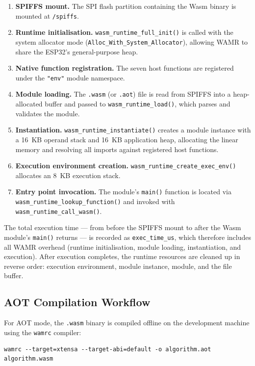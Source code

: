 \documentclass[12pt, a4paper]{report}
\begin{document}
\begin{enumerate}
    \item \textbf{SPIFFS mount.} The SPI flash partition containing the Wasm binary is mounted at \texttt{/spiffs}.
    \item \textbf{Runtime initialisation.} \texttt{wasm\_runtime\_full\_init()} is called with the system allocator mode (\texttt{Alloc\_With\_System\_Allocator}), allowing WAMR to share the ESP32's general-purpose heap.
    \item \textbf{Native function registration.} The seven host functions are registered under the \texttt{"env"} module namespace.
    \item \textbf{Module loading.} The \texttt{.wasm} (or \texttt{.aot}) file is read from SPIFFS into a heap-allocated buffer and passed to \texttt{wasm\_runtime\_load()}, which parses and validates the module.
    \item \textbf{Instantiation.} \texttt{wasm\_runtime\_instantiate()} creates a module instance with a 16~KB operand stack and 16~KB application heap, allocating the linear memory and resolving all imports against registered host functions.
    \item \textbf{Execution environment creation.} \texttt{wasm\_runtime\_create\_exec\_env()} allocates an 8~KB execution stack.
    \item \textbf{Entry point invocation.} The module's \texttt{main()} function is located via \texttt{wasm\_runtime\_lookup\_function()} and invoked with \texttt{wasm\_runtime\_call\_wasm()}.
\end{enumerate}

The total execution time --- from before the SPIFFS mount to after the Wasm module's \texttt{main()} returns --- is recorded as \texttt{exec\_time\_us}, which therefore includes all WAMR overhead (runtime initialisation, module loading, instantiation, and execution). After execution completes, the runtime resources are cleaned up in reverse order: execution environment, module instance, module, and the file buffer.

\subsection{AOT Compilation Workflow}
\label{subsec:aot-workflow}

For AOT mode, the \texttt{.wasm} binary is compiled offline on the development machine using the \texttt{wamrc} compiler:

\begin{verbatim}
wamrc --target=xtensa --target-abi=default -o algorithm.aot algorithm.wasm
\end{verbatim}
\end{document}
